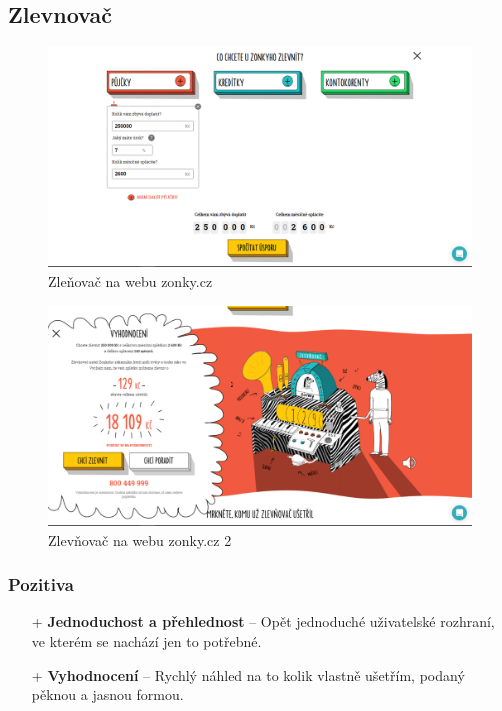 \newpage
\subsection{Zlevnovač}
\begin{figure}[h]
    \centering
    \includegraphics[width=1.0\textwidth]{media/zonky/zlevnovac.png}
    \caption{Zleňovač na webu zonky.cz}
    \label{fig:zonky:zlevnovac}
\end{figure}
\begin{figure}[h]
    \centering
    \includegraphics[width=1.0\textwidth]{media/zonky/zlevnovac2.png}
    \caption{Zlevňovač na webu zonky.cz 2}
    \label{fig:zonky:zlevnovac2}
\end{figure}
\subsubsection*{Pozitiva}
\begin{itemize}
    \item[+] \textbf{Jednoduchost a přehlednost} -- Opět jednoduché uživatelské rozhraní, ve kterém se nachází jen to potřebné.
    \item[+] \textbf{Vyhodnocení} -- Rychlý náhled na to kolik vlastně ušetřím, podaný pěknou a jasnou formou.
\end{itemize}
